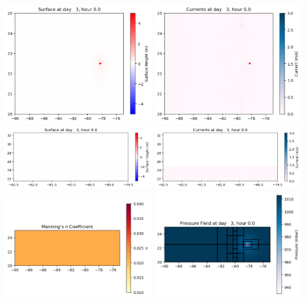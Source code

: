 \documentclass[11pt]{article}
\begin{document}
\vskip 10pt 
\includegraphics[width=0.475\textwidth]{frame0012fig1001.png}
\includegraphics[width=0.475\textwidth]{frame0012fig1002.png}
\vskip 10pt 
\includegraphics[width=0.475\textwidth]{frame0012fig1003.png}
\includegraphics[width=0.475\textwidth]{frame0012fig1004.png}
\vskip 10pt 
\includegraphics[width=0.475\textwidth]{frame0012fig1005.png}
\includegraphics[width=0.475\textwidth]{frame0012fig1006.png}
\end{document}
